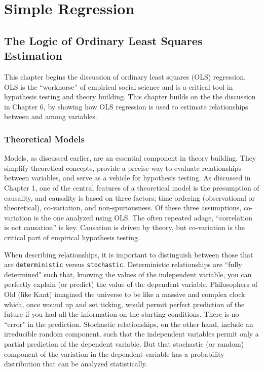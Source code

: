 \documentclass[11pt,openany]{book}\usepackage[]{graphicx}\usepackage[]{color}
\begin{document}
\part{Simple Regression} 



\chapter{The Logic of Ordinary Least Squares Estimation}

This chapter begins the discussion of ordinary least squares (OLS) regression. OLS is the ``workhorse'' of empirical social science and is a critical tool in hypothesis testing and theory building. This chapter builds on the the discussion in Chapter 6, by showing how OLS regression is used to estimate relationships between and among variables. 

\section{Theoretical Models}

Models, as discussed earlier, are an essential component in theory building. They simplify theoretical concepts, provide a precise way to evaluate relationships between variables, and serve as a vehicle for hypothesis testing. As discussed in Chapter 1, one of the central features of a theoretical model is the presumption of causality, and causality is based on three factors; time ordering (observational or theoretical), co-variation, and non-spuriousness. Of these three assumptions, co-variation is the one analyzed using OLS. The often repeated adage, ``correlation is not causation'' is key. Causation is driven by theory, but co-variation is the critical part of empirical hypothesis testing. 

When describing relationships, it is important to distinguish between those that are \texttt{deterministic} versus \texttt{stochastic}. Deterministic relationships are ``fully determined" such that, knowing the values of the independent variable, you can perfectly explain (or predict) the value of the dependent variable. Philosophers of Old (like Kant) imagined the universe to be like a massive and complex clock which, once wound up and set ticking, would permit perfect prediction of the future if you had all the information on the starting conditions. There is no ``error" in the prediction. Stochastic relationships, on the other hand, include an irreducible random component, such that the independent variables permit only a partial prediction of the dependent variable. But that stochastic (or random) component of the variation in the dependent variable has a probability distribution that can be analyzed statistically. 
\end{document}
